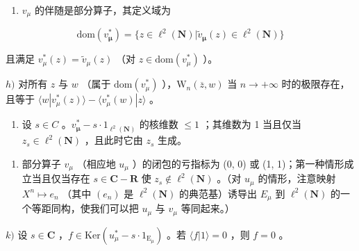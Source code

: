 \begin{enumerate}
\def\labelenumi{\alph{enumi})}
\setcounter{enumi}{6}
\tightlist
\item
  \(v_{\mu}\) 的伴随是部分算子，其定义域为
\end{enumerate}

\[
\mathrm{dom} (v _ {\boldsymbol {\mu}} ^ {*}) = \{z \in \ell^ {2} (\mathbf {N}) | \widetilde {v} _ {\boldsymbol {\mu}} (z) \in \ell^ {2} (\mathbf {N}) \}
\]

且满足 \(v_{\mu}^{*}(z) = \widetilde{v}_{\mu}(z)\) （对 \(z \in \mathrm{dom}(v_{\mu}^{*})\) ）。

\(h)\) 对所有 \(z\) 与 \(w\) （属于 \(\mathrm{dom}(v_{\mu}^{*})\) ），\(\mathrm{W}_{n}(\overline{z}, w)\) 当 \(n \to +\infty\) 时的极限存在，且等于 \(\langle w | v_{\mu}^{*}(z) \rangle - \langle v_{\mu}^{*}(w) | z \rangle\) 。

\begin{enumerate}
\def\labelenumi{\roman{enumi})}
\tightlist
\item
  设 \(s \in C\) 。\(v_{\boldsymbol{\mu}}^{*} - s \cdot 1_{\ell^{2}(\mathbf{N})}\) 的核维数 \(\leqslant 1\) ；其维数为 1 当且仅当 \(z_{s} \in \ell^{2}(\mathbf{N})\) ，且此时它由 \(z_{s}\) 生成。
\end{enumerate}

\begin{enumerate}
\def\labelenumi{\alph{enumi})}
\setcounter{enumi}{9}
\tightlist
\item
  部分算子 \(v_{\mu}\) （相应地 \(u_{\mu}\) ）的闭包的亏指标为 (0, 0) 或 (1, 1)；第一种情形成立当且仅当存在 \(s \in \mathbf{C} - \mathbf{R}\) 使 \(z_s \notin \ell^2(\mathbf{N})\) 。（对 \(u_{\mu}\) 的情形，注意映射 \(X^n \mapsto e_n\) （其中 \((e_n)\) 是 \(\ell^2(\mathbf{N})\) 的典范基）诱导出 \(E_{\mu}\) 到 \(\ell^2(\mathbf{N})\) 的一个等距同构，使我们可以把 \(u_{\mu}\) 与 \(v_{\mu}\) 等同起来。）
\end{enumerate}

\(k)\) 设 \(s \in \mathbf{C}\) ，\(f \in \mathrm{Ker}(u_{\mu}^{*} - s \cdot 1_{\mathrm{E}_{\mu}})\) 。若 \(\langle f | 1 \rangle = 0\) ，则 \(f = 0\) 。

